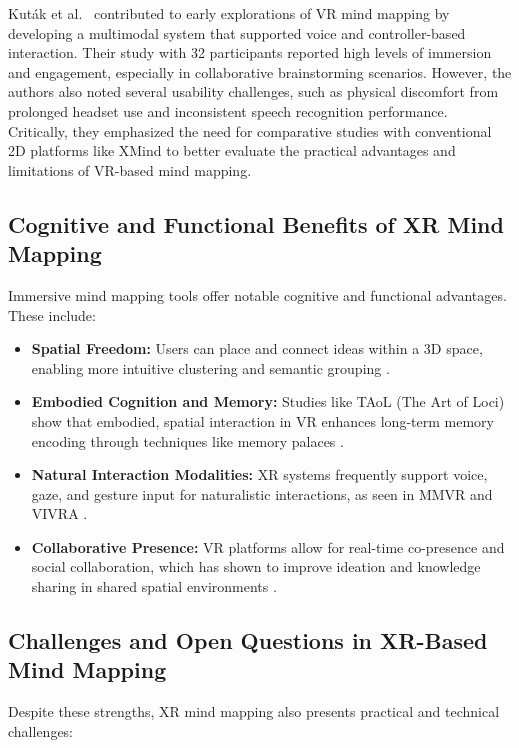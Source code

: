 \documentclass{CPP}
\begin{document}
Kuták et al.\ \citep{Kutak2019} contributed to early explorations of VR mind mapping by developing a multimodal system that supported voice and controller-based interaction. Their study with 32 participants reported high levels of immersion and engagement, especially in collaborative brainstorming scenarios. However, the authors also noted several usability challenges, such as physical discomfort from prolonged headset use and inconsistent speech recognition performance. Critically, they emphasized the need for comparative studies with conventional 2D platforms like XMind to better evaluate the practical advantages and limitations of VR-based mind mapping.


\subsection{Cognitive and Functional Benefits of XR Mind Mapping}

Immersive mind mapping tools offer notable cognitive and functional advantages. These include:

\begin{itemize}
  \item \textbf{Spatial Freedom:} Users can place and connect ideas within a 3D space, enabling more intuitive clustering and semantic grouping \citep{Kozachek2023}.
  \item \textbf{Embodied Cognition and Memory:} Studies like TAoL (The Art of Loci) show that embodied, spatial interaction in VR enhances long-term memory encoding through techniques like memory palaces \citep{Vetter2020}.
  \item \textbf{Natural Interaction Modalities:} XR systems frequently support voice, gaze, and gesture input for naturalistic interactions, as seen in MMVR and VIVRA \citep{Xing2024}.
  \item \textbf{Collaborative Presence:} VR platforms allow for real-time co-presence and social collaboration, which has shown to improve ideation and knowledge sharing in shared spatial environments \citep{Kozachek2023}.
\end{itemize}

\subsection{Challenges and Open Questions in XR-Based Mind Mapping}

Despite these strengths, XR mind mapping also presents practical and technical challenges:
\end{document}
